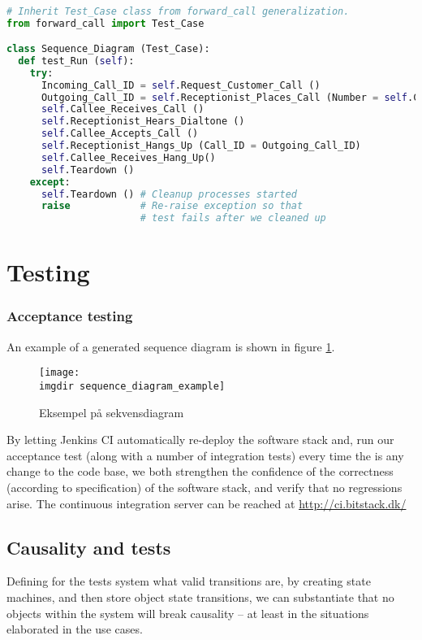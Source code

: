 \begin{lstlisting}[language=Python, caption=Example of a generated test, label=fig:python_test]

# Inherit Test_Case class from forward_call generalization.
from forward_call import Test_Case

class Sequence_Diagram (Test_Case):
  def test_Run (self):
    try:
      Incoming_Call_ID = self.Request_Customer_Call ()
      Outgoing_Call_ID = self.Receptionist_Places_Call (Number = self.Callee.extension)
      self.Callee_Receives_Call ()
      self.Receptionist_Hears_Dialtone ()
      self.Callee_Accepts_Call ()
      self.Receptionist_Hangs_Up (Call_ID = Outgoing_Call_ID)
      self.Callee_Receives_Hang_Up()
      self.Teardown ()
    except:
      self.Teardown () # Cleanup processes started
      raise            # Re-raise exception so that 
                       # test fails after we cleaned up
\end{lstlisting}

\section{Testing}

\subsubsection{Acceptance testing}
An example of a generated sequence diagram is shown in figure \ref{fig:sequence_diagram_example}.
\begin{figure}[ht]
\centering
\texttt{[image: \\imgdir sequence\_diagram\_example]}
\caption{Eksempel på sekvensdiagram}
\label{fig:sequence_diagram_example}
\end{figure}
By letting Jenkins CI automatically re-deploy the software stack and, run our acceptance test (along with a number of integration tests) every time the is any change to the code base, we both strengthen the confidence of the correctness (according to specification) of the software stack, and verify that no regressions arise. The continuous integration server can be reached at \url{http://ci.bitstack.dk/}


\subsection{Causality and tests}
Defining for the tests system what valid transitions are, by creating state machines, and then store object state transitions, we can substantiate that no objects within the system will break causality -- at least in the situations elaborated in the use cases.

